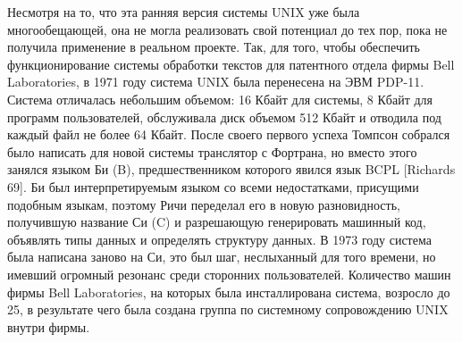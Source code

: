     Несмотря на то, что эта ранняя версия системы UNIX уже была многообещающей,  она  не  могла реализовать свой потенциал до тех пор, пока не получила применение в реальном проекте. Так, для того, чтобы обеспечить  функционирование   системы   обработки   текстов   для  патентного  отдела  фирмы  Bell Laboratories, в 1971 году система UNIX была перенесена на ЭВМ PDP-11. Система отличалась небольшим объемом: 16 Кбайт для системы, 8 Кбайт для  программ пользователей, обслуживала диск объемом 512 Кбайт и отводила под каждый файл не  более  64 Кбайт. После своего первого успеха Томпсон собрался было написать для новой системы транслятор с Фортрана, но вместо этого занялся языком Би (B), предшественником которого явился язык BCPL [Richards 69]. Би был интерпретируемым языком со всеми недостатками, присущими подобным языкам, поэтому Ричи переделал его в новую разновидность, получившую название Си (C)  и разрешающую  генерировать  машинный  код, объявлять типы данных и определять структуру данных. В 1973 году система была написана заново на  Си,  это  был шаг,  неслыханный  для того времени, но имевший огромный резонанс среди сторонних пользователей. Количество машин фирмы Bell Laboratories,  на  которых была  инсталлирована система, возросло до 25, в результате чего была создана группа по системному сопровождению UNIX внутри фирмы.

